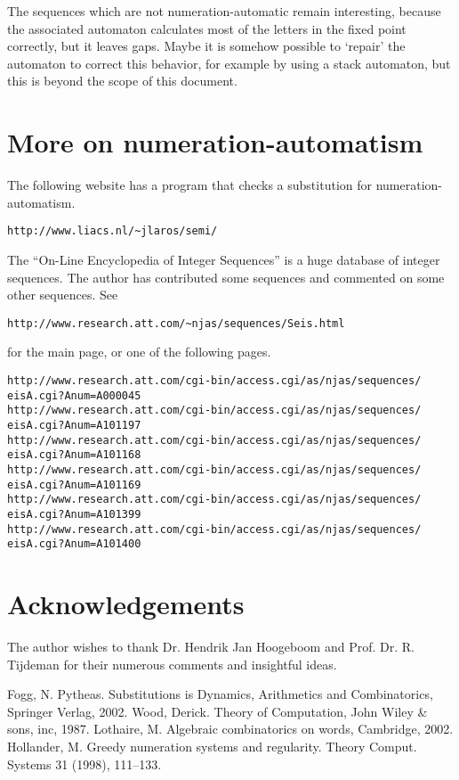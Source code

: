 \documentclass{article}
\theoremstyle{definition}
\begin{document}
The sequences which are not numeration-automatic remain interesting, because 
the associated automaton calculates most of the letters in the fixed point 
correctly, but it leaves gaps.  Maybe it is somehow possible to `repair' the 
automaton to correct this behavior, for example by using a stack automaton, 
but this is beyond the scope of this document.

\section{More on numeration-automatism}
The following website has a program that checks a substitution for 
numeration-automatism.
\begin{verbatim}
http://www.liacs.nl/~jlaros/semi/
\end{verbatim}

The ``On-Line Encyclopedia of Integer Sequences'' is a huge database of integer
sequences. The author has contributed some sequences and commented on some
other sequences. See
\begin{verbatim}
http://www.research.att.com/~njas/sequences/Seis.html
\end{verbatim}

for the main page, or one of the following pages.
\begin{verbatim}
http://www.research.att.com/cgi-bin/access.cgi/as/njas/sequences/
eisA.cgi?Anum=A000045
http://www.research.att.com/cgi-bin/access.cgi/as/njas/sequences/
eisA.cgi?Anum=A101197
http://www.research.att.com/cgi-bin/access.cgi/as/njas/sequences/
eisA.cgi?Anum=A101168
http://www.research.att.com/cgi-bin/access.cgi/as/njas/sequences/
eisA.cgi?Anum=A101169
http://www.research.att.com/cgi-bin/access.cgi/as/njas/sequences/
eisA.cgi?Anum=A101399
http://www.research.att.com/cgi-bin/access.cgi/as/njas/sequences/
eisA.cgi?Anum=A101400
\end{verbatim}

\section{Acknowledgements}
The author wishes to thank Dr. Hendrik Jan Hoogeboom and Prof. Dr. R. Tijdeman
for their numerous comments and insightful ideas.


\begin{thebibliography}{XX}
 Fogg, N. Pytheas. Substitutions is Dynamics, Arithmetics and
               Combinatorics, Springer Verlag, 2002.
 Wood, Derick. Theory of Computation, John Wiley \& sons, inc, 
               1987.
 Lothaire, M. Algebraic combinatorics on words, Cambridge, 2002.
 Hollander, M. Greedy numeration systems and regularity.
              Theory Comput. Systems 31 (1998), 111--133.
\end{thebibliography}
\end{document}
